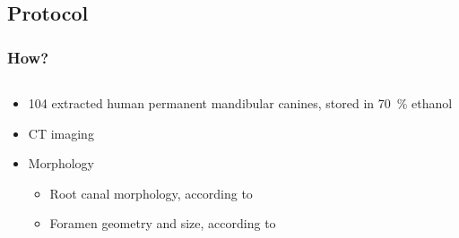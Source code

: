 \documentclass[aspectratio=169]{beamer}
\newcommand{\imwidth}{\linewidth}%
\newcommand{\uct}{\si{\micro}CT\xspace}%
\begin{document}
\subsection{Protocol}
\renewcommand{\imwidth}{\columnwidth}
\begin{frame}[label=current]
	\frametitle{How?}
	\begin{columns}
		\begin{column}{0.49\linewidth}
			\begin{itemize}
				\item<1-> 104 extracted human permanent mandibular canines, stored in \SI{70}{\percent} ethanol
				\item<2-> \uct imaging
				\item<4-> Morphology
				\begin{itemize}
					\item<4-> Root canal  morphology, according to~\citeauthor{Briseno-Marroquin2015}~\cite{Briseno-Marroquin2015}
					\item<5-> Foramen geometry and size, according to~\citeauthor{Wolf2017}~\cite{Wolf2017}
				\end{itemize}
				

\end{itemize}
\end{column}
\end{columns}
\end{frame}
\end{document}
